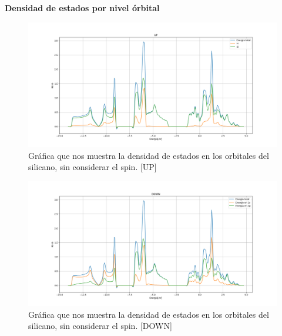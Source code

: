 \begin{frame}
    \textbf{Densidad de estados por nivel órbital}
    \begin{figure}[H]
        \centering
        \includegraphics[scale=0.3]{images_silicano/Densidad_estados_con_spin_up_elementos.png}
        \caption{Gráfica que nos muestra la densidad de estados en los orbitales del silicano, sin considerar el spin. [UP]}
    \end{figure}
\end{frame}

\begin{frame}
    \begin{figure}[H]
        \centering
        \includegraphics[scale=0.3]{images_silicano/Densidad_estados_con_spin_down.png}
        \caption{Gráfica que nos muestra la densidad de estados en los orbitales del silicano, sin considerar el spin. [DOWN]}
    \end{figure}
\end{frame}

\vspace{0.5cm}

